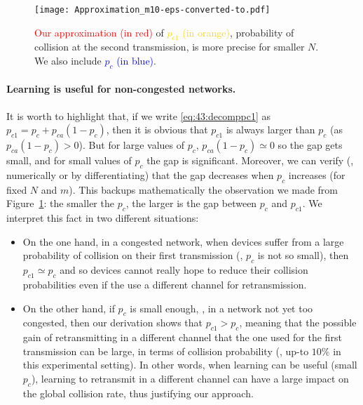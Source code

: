 \begin{figure}[htp!]  %
	\centering
	\texttt{[image: Approximation\_m10-eps-converted-to.pdf]}
	\caption[Our approximation for the probability of collision at the second transmission.]{\textcolor{red}{Our approximation (in red)} of \textcolor{gold}{$p_{c1}$ (in orange)}, probability of collision at the second transmission, is more precise for smaller $N$. We also include \textcolor{blue}{$p_{c}$ (in blue)}.}
	\label{fig:43:Approximation_m10}
\end{figure}


\paragraph{Learning is useful for non-congested networks.}

It is worth to highlight that, if we write \eqref{eq:43:decomppc1} as $p_{c1} = p_c + p_{ca} \left(1-p_c\right)$,
then it is obvious that $p_{c1}$ is always larger than $p_c$ (as $p_{ca} \left(1-p_c\right) > 0$).
But for large values of $p_c$, $p_{ca}\left(1-p_c\right) \simeq 0$ so the gap gets small,
and for small values of $p_c$ the gap is significant.
Moreover, we can verify (\eg, numerically or by differentiating)
that the gap decreases when $p_c$ increases (for fixed $N$ and $m$).
This backups mathematically the observation we made from Figure~\ref{fig:43:Approximation_m10}:
the smaller the $p_c$, the larger is the gap between $p_c$ and $p_{c1}$.
%
We interpret this fact in two different situations:
\begin{itemize}
	\item
	On the one hand, in a congested network, when devices suffer from a large probability of collision on their first transmission (\ie, $p_c$ is not so small), then $p_{c1}\simeq p_c$ and so devices cannot really hope to reduce their collision probabilities even if the use a different channel for retransmission.
	\item
	On the other hand, if $p_c$ is small enough, \ie, in a network not yet too congested, then our derivation shows that $p_{c1} > p_c$, meaning that the possible gain of retransmitting in a different channel that the one used for the first transmission can be large, in terms of collision probability (\eg, up-to $10\%$ in this experimental setting).
	In other words, when learning can be useful (small $p_c$), learning to retransmit in a different channel can have a large impact on the global collision rate,
	thus justifying our approach.
\end{itemize}

